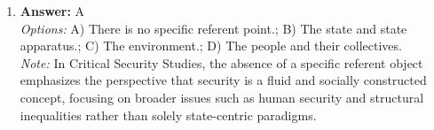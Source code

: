 \documentclass[12pt]{article}
\begin{document}
\begin{enumerate}[label=\arabic*.]
\\ \textit{Note:} The power to declare war rests with Congress as outlined in Article I, Section 8 of the U.S. Constitution, which grants this authority explicitly to the legislative branch, ensuring a system of checks and balances between the branches of government.
\item \textbf{Answer:} A
\\ \textit{Options:} A) There is no specific referent point.; B) The state and state apparatus.; C) The environment.; D) The people and their collectives.
\\ \textit{Note:} In Critical Security Studies, the absence of a specific referent object emphasizes the perspective that security is a fluid and socially constructed concept, focusing on broader issues such as human security and structural inequalities rather than solely state-centric paradigms.
\end{enumerate}
\end{document}
